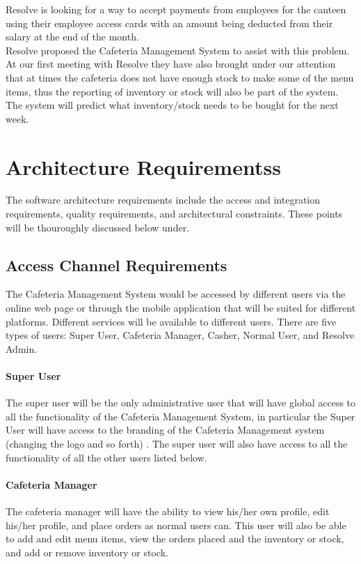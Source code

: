 \documentclass[12pt]{article}
\begin{document}
Resolve is looking for a way to accept payments from employees for the canteen
using their employee access cards with an amount being deducted from their salary at the end of the month.\\

Resolve proposed the Cafeteria Management System to assist with this problem.
At our first meeting with Resolve they have also brought under our attention that at times the cafeteria does not have enough stock to make some of the menu items, thus the reporting of inventory or stock will also be part of the system. The system will predict what inventory/stock needs to be bought for the next week.

\section{Architecture Requirementss}
The software architecture requirements include the access and integration requirements, quality
requirements, and architectural constraints. These points will be thouroughly discussed below under.

\subsection{Access Channel Requirements}
The Cafeteria Management System would be accessed by different users via  the online web page or through the mobile application that will be suited for different platforms. Different services will be available to different users. There are five types of users: Super User, Cafeteria Manager, Casher, Normal User, and Resolve Admin. \\

\paragraph{Super User\\}
The super user will be the only administrative user that will have global access to all the functionality of the Cafeteria Management System, in particular the Super User will have access to the branding of the Cafeteria Management system (changing the logo and so forth) . The super user will also have access to all the functionality of all the other users listed below.

\paragraph{ Cafeteria Manager\\}
The cafeteria manager will have the ability to view his/her own profile, edit his/her profile, and place orders as normal users can. This user will also be able to add and edit menu items, view the orders placed and the inventory or stock, and add or remove inventory or stock. 
\end{document}
